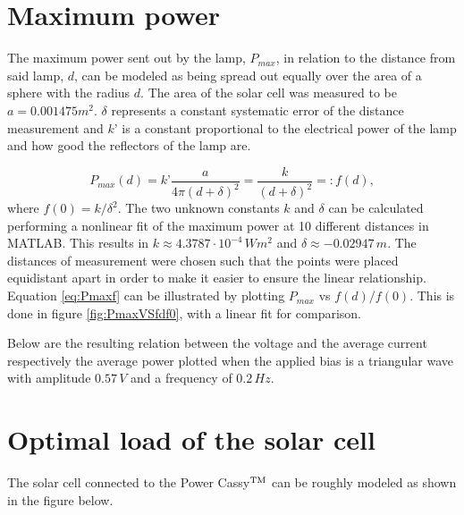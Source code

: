 \documentclass[a4paper,twoside=false,abstract=false,numbers=noenddot,
titlepage=false,headings=small,parskip=half,version=last]{scrartcl}
\begin{document}
\section{Maximum power}
The maximum power sent out by the lamp, $P_{max}$, in relation to the distance from said lamp, $d$, can be modeled as being spread out equally over the area of a sphere with the radius $d$.
The area of the solar cell was measured to be $a=0.001475 m^{2}$.
$\delta$ represents a constant systematic error of the distance measurement and $k’$ is a constant proportional to the electrical power of the lamp and how good the reflectors of the lamp are.

\begin{equation}
    P_{max}(d) = k’\frac{a}{4\pi(d+\delta)^2} = \frac{k}{(d+\delta)^2} =: f(d),\label{eq:Pmaxf}
\end{equation}
where $f(0) = k/\delta^2$.
The two unknown constants $k$ and $\delta$ can be calculated performing a
nonlinear fit of the maximum power at 10 different distances in MATLAB. This
results in $k \approx 4.3787\cdot 10^{-4}\,Wm^{2}$ and $\delta \approx -0.02947\,m$.
The distances of measurement were chosen such that the points were placed equidistant apart
in order to make it easier to ensure the linear relationship.
Equation \eqref{eq:Pmaxf} can be illustrated by plotting $P_{max}$ vs $f(d)/f(0)$.
This is done in figure \ref{fig:PmaxVSfdf0}, with a linear fit for comparison.


Below are the resulting relation between the voltage and the average current
respectively the average power plotted when the applied bias is a triangular
wave with amplitude $0.57\,V$ and a frequency of $0.2\,Hz$.




\section{Optimal load of the solar cell}
The solar cell connected to the Power Cassy$\textsuperscript{TM}$ can be roughly modeled as shown in the figure below.

\end{document}

